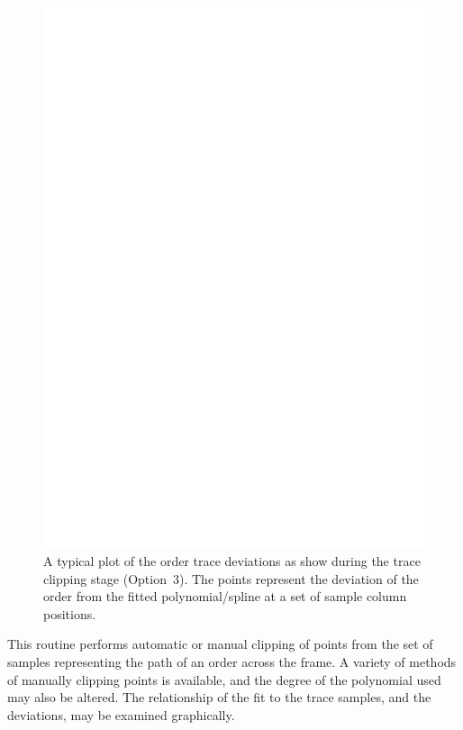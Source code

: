 \documentclass[twoside,11pt]{article}
\renewcommand{\_}{\texttt{\symbol{95}}}
\newcommand{\sunspec}[2]{#1}
\newcommand{\sunspec}[2]{#2}
\begin{document}
\begin{figure}
\begin{center}
\includegraphics[width=\textwidth]{sun152_02.eps}

\parbox{140mm}{
\caption{A typical plot of the order trace deviations as show during
the trace clipping stage (Option~3).  The points represent the
deviation of the order from the fitted polynomial/spline at a set of
sample column positions.}
\label{fi_tclip}
}
\end{center}
\end{figure}

This routine performs automatic or manual  clipping of points from the
set of samples representing the path of an order across the frame.
A variety of methods of manually clipping points is available, and the degree
of the polynomial used may also be altered. The relationship of the fit
to the trace samples, and the deviations, may be examined graphically.
\end{document}

